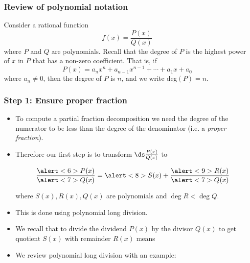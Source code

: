 \begin{frame}
\frametitle{Review of polynomial notation}
Consider a rational function
\[
f(x) = \frac{P(x)}{Q(x)}
\]
where $P$ and $Q$ are polynomials.  Recall that the degree of $P$ is the highest power of $x$ in $P$ that has a non-zero coefficient.  That is, if
\[
P(x) = a_nx^n + a_{n-1}x^{n-1} + \cdots + a_1x + a_0
\]
where $a_n \neq 0$, then the degree of $P$ is $n$, and we write deg$(P) = n$.

\end{frame}
\begin{frame}\frametitle{Step 1: Ensure proper fraction}
\begin{itemize}
\item To compute a partial fraction decomposition we need  the degree of the numerator to be less than the degree of the denominator (i.e. a \textit{proper fraction}).
\item<2-> Therefore our first step is to transform $\ds \frac{P(x)}{Q(x)}$ to

\[ \frac{\alert<6>{P(x)}}{\alert<7>{Q(x)} }= \alert<8>{S(x)}+\frac{\alert<9>{R(x)}}{\alert<7>{Q(x)}} 
\]

where $S(x), R(x), Q(x)$ are polynomials and $\deg R<\deg Q$.
\item<3-> This is done using polynomial long division.
\item<4-> We recall that to divide the \alert<6>{dividend $P(x)$} by the \alert<7>{divisor $Q(x)$} to get \alert<8>{quotient $S(x)$} with \alert<9>{remainder $R(x)$} means 
\item<10-> We review polynomial long division with an example:
\end{itemize}



\end{frame}
